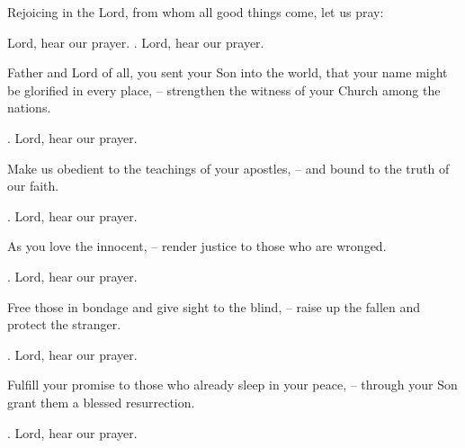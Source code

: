 \lettrine[lines=2]{R}{}ejoicing in the Lord, from whom all good things come, let us pray: \par Lord, hear our prayer.
\Rbar. Lord, hear our prayer.

Father and Lord of all, you sent your Son into the world, that your name might be glorified in every place,
– strengthen the witness of your Church among the nations.
\par \Rbar. Lord, hear our prayer.

Make us obedient to the teachings of your apostles,
– and bound to the truth of our faith.
\par \Rbar. Lord, hear our prayer.

As you love the innocent,
– render justice to those who are wronged.
\par \Rbar. Lord, hear our prayer.

Free those in bondage and give sight to the blind,
– raise up the fallen and protect the stranger.
\par \Rbar. Lord, hear our prayer.

Fulfill your promise to those who already sleep in your peace,
– through your Son grant them a blessed resurrection.
\par \Rbar. Lord, hear our prayer.
